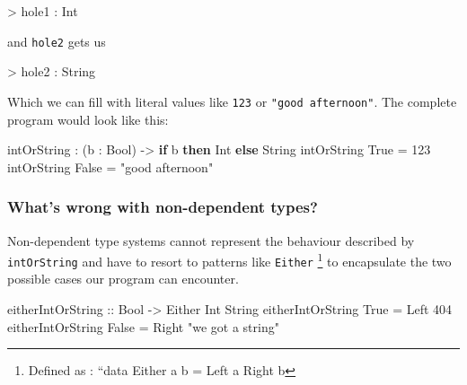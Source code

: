 \documentclass[
]{article}
\newenvironment{Shaded}{}{}
\newcommand{\DataTypeTok}[1]{\textcolor[rgb]{0.56,0.13,0.00}{#1}}
\newcommand{\DecValTok}[1]{\textcolor[rgb]{0.25,0.63,0.44}{#1}}
\newcommand{\KeywordTok}[1]{\textcolor[rgb]{0.00,0.44,0.13}{\textbf{#1}}}
\newcommand{\NormalTok}[1]{#1}
\newcommand{\OperatorTok}[1]{\textcolor[rgb]{0.40,0.40,0.40}{#1}}
\newcommand{\OtherTok}[1]{\textcolor[rgb]{0.00,0.44,0.13}{#1}}
\newcommand{\StringTok}[1]{\textcolor[rgb]{0.25,0.44,0.63}{#1}}
\begin{document}
\begin{Shaded}
\begin{Highlighting}[]
\OperatorTok{\textgreater{}}\NormalTok{ hole1 }\OperatorTok{:} \DataTypeTok{Int}
\end{Highlighting}
\end{Shaded}

and \texttt{hole2} gets us

\begin{Shaded}
\begin{Highlighting}[]
\OperatorTok{\textgreater{}}\NormalTok{ hole2 }\OperatorTok{:} \DataTypeTok{String}
\end{Highlighting}
\end{Shaded}

Which we can fill with literal values like \texttt{123} or
\texttt{"good\ afternoon"}. The complete program would look like this:

\begin{Shaded}
\begin{Highlighting}[]
\NormalTok{intOrString }\OperatorTok{:}\NormalTok{ (b }\OperatorTok{:} \DataTypeTok{Bool}\NormalTok{) }\OtherTok{{-}\textgreater{}} \KeywordTok{if}\NormalTok{ b }\KeywordTok{then} \DataTypeTok{Int} \KeywordTok{else} \DataTypeTok{String}
\NormalTok{intOrString }\DataTypeTok{True} \OtherTok{=} \DecValTok{123}
\NormalTok{intOrString }\DataTypeTok{False} \OtherTok{=} \StringTok{"good afternoon"}
\end{Highlighting}
\end{Shaded}

\hypertarget{whats-wrong-with-non-dependent-types}{%
\subsubsection{What's wrong with non-dependent
types?}\label{whats-wrong-with-non-dependent-types}}

Non-dependent type systems cannot represent the behaviour described by
\texttt{intOrString} and have to resort to patterns like \texttt{Either}
\footnote{Defined as : ``data Either a b = Left a \textbar{} Right b} to
encapsulate the two possible cases our program can encounter.

\begin{Shaded}
\begin{Highlighting}[]
\OtherTok{eitherIntOrString ::} \DataTypeTok{Bool} \OtherTok{{-}\textgreater{}} \DataTypeTok{Either} \DataTypeTok{Int} \DataTypeTok{String}
\NormalTok{eitherIntOrString }\DataTypeTok{True} \OtherTok{=} \DataTypeTok{Left} \DecValTok{404}
\NormalTok{eitherIntOrString }\DataTypeTok{False} \OtherTok{=} \DataTypeTok{Right} \StringTok{"we got a string"}
\end{Highlighting}
\end{Shaded}
\end{document}
